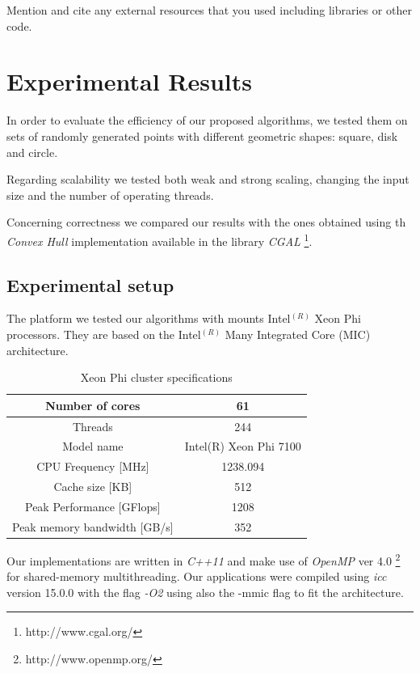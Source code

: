 \documentclass[letterpaper]{article}
\theoremstyle{definition}
\begin{document}
Mention and cite any external resources that you used including libraries or other code.
\fi

\section{Experimental Results}\label{sec:exp}
In order to evaluate the efficiency of our proposed algorithms, we tested them on sets of randomly generated points with different geometric shapes: square, disk and circle.

Regarding scalability we tested both weak and strong scaling, changing the input size and the number of operating threads.

Concerning correctness we compared our results with the ones obtained using th \textit{Convex Hull} implementation available in the library \textit{CGAL} \footnote{http://www.cgal.org/}.

\subsection{Experimental setup}

The platform we tested our algorithms with mounts Intel$^{(R)}$ Xeon Phi processors. They are based on the Intel$^{(R)}$ Many Integrated Core (MIC) architecture.

\begin{table}[!ht]
\begin{tabular}{|c|c|}
\hline Number of cores			& 61\\
\hline Threads					& 244\\
\hline Model name				& Intel(R) Xeon Phi 7100\\
\hline CPU Frequency [MHz]		& 1238.094\\
\hline Cache size [KB]			& 512\\
\hline Peak Performance [GFlops]	& 1208\\
\hline Peak memory bandwidth [GB/s]		& 352\\
\hline
\end{tabular}
\caption{Xeon Phi cluster specifications}
\end{table}

Our implementations are written in \textit{C++11} and make use of \textit{OpenMP} ver 4.0 \footnote{http://www.openmp.org/} for shared-memory multithreading.
Our applications were compiled using \textit{icc} version 15.0.0 with the flag \textit{-O2} using also the -mmic flag to fit the architecture.
\end{document}
